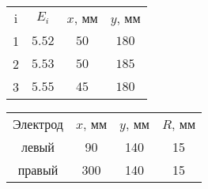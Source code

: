 \!
\begin{tabular}[b]{cccc}
	i & $ E_i  $ & $ x $, мм & $ y $, мм \\
	1 & $ 5.52 $ & $ 50 $    & $ 180 $ \\
	2 & $ 5.53 $ & $ 50 $    & $ 185 $ \\
	3 & $ 5.55 $ & $ 45 $    & $ 180 $ \\	
\end{tabular}
\!
\begin{tabular}[b]{cccc}	
	Электрод & $ x $, мм & $ y $, мм & $ R $, мм \\
	левый & 90 & 140 & 15 \\
	правый & 300 & 140 & 15 \\
\end{tabular}